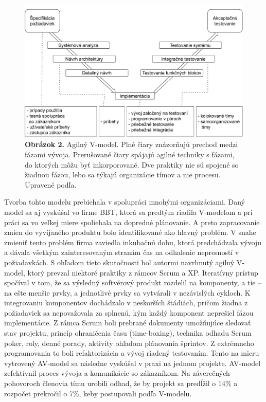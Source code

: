 \documentclass[10pt,twoside,slovak,a4paper]{article}
\begin{document}
\begin{figure}[h!]
\begin{center}
\includegraphics[scale=0.5]{obrazok2.pdf} %
\end{center}
\caption{\protect\textbf{Obrázok 2.} Agilný V-model. Plné čiary znázorňujú prechod medzi fázami vývoja. Prerušované čiary spájajú agilné techniky s fázami, do ktorých môžu byť inkorporované. Dve praktiky nie sú spojené so žiadnou fázou, lebo sa týkajú organizácie tímov a nie procesu. Upravené podľa\protect\cite{mchugh2013}.}
\label{fig:avm}
\end{figure}
\medskip

Tvorba tohto modelu prebiehala v spolupráci mnohými organizáciami. Daný model sa aj vyskúšal vo firme BBT, ktorá sa predtým riadila V-modelom a pri práci sa vo veľkej miere spoliehala na dopredné plánovanie. A preto zapracovanie zmien do vyvíjaného produktu bolo identifikované ako hlavný problém. V snahe zmieniť tento problém firma zaviedla inkubačnú dobu, ktorá predchádzala vývoju a dávala všetkým zainteresovaným stranám čas na odhalenie nepresností v požiadavkách. S ohľadom tieto skutočnosti bol autormi navrhnutý agilný V-model, ktorý prevzal niektoré praktiky z rámcov Scrum a XP. Iteratívny prístup spočíval v tom, že sa výsledný softvérový produkt rozdelil na komponenty, a tie – na ešte menšie prvky, a jednotlivé prvky sa vytvárali v nezávislých cykloch. K integrovaniu komponentov dochádzalo v neskorších štádiách, pričom žiadna z požiadaviek sa nepovažovala za splnenú, kým každý komponent neprešiel fázou implementácie. Z rámca Scrum boli prebrané dokumenty umožňujúce sledovať stav projektu, princíp ohraničenia času (time-boxing), technika odhadu Scrum poker, roly, denné porady, aktivity ohľadom plánovania šprintov. Z extrémneho programovania to boli refaktorizácia a vývoj riadený testovaním. Tento na mieru vytrovený AV-model sa následne vyskúšal v praxi na jednom projekte. AV-model zefektívnil proces vývoja a komunikácie so zákazníkom. Na záverečných pohovoroch členovia tímu urobili odhad, že by projekt sa predĺžil o 14\% a rozpočet prekročil o 7\%, keby postupovali podľa V-modelu\cite{AVmodelPrax}.
\end{document}
